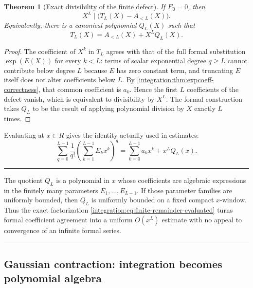 \documentclass[11pt,oneside]{article}
\newtheorem{theorem}{Theorem}[section]
\theoremstyle{definition}
\theoremstyle{remark}
\newenvironment{boxedremark}{%
  \par\smallskip\noindent\begin{center}\begin{minipage}{0.94\textwidth}%
  \color{black}\hrule\vspace{0.6em}\small
}{%
  \vspace{0.6em}\hrule\end{minipage}\end{center}\smallskip
}
\begin{document}
\begin{theorem}[Exact divisibility of the finite defect]
\label{integration:thm:finite-defect-divisibility}
If $E_0=0$, then
\begin{equation}
 X^L\mid\bigl(T_L(X)-A_{<L}(X)\bigr).
 \label{integration:eq:defect-divisibility}
\end{equation}
Equivalently, there is a canonical polynomial $Q_L(X)$ such that
\begin{equation}
 T_L(X)=A_{<L}(X)+X^LQ_L(X).
 \label{integration:eq:exact-finite-remainder-polynomial}
\end{equation}
\end{theorem}

\begin{proof}
The coefficient of $X^k$ in $T_L$ agrees with that of the full formal substitution
$\exp(E(X))$ for every $k<L$: terms of scalar exponential degree $q\ge L$ cannot contribute
below degree $L$ because $E$ has zero constant term, and truncating $E$ itself does not alter
coefficients below $L$.  By \cref{integration:thm:expcoeff-correctness}, that common coefficient is
$a_k$.  Hence the first $L$ coefficients of the defect vanish, which is equivalent to
divisibility by $X^L$.  The formal construction takes $Q_L$ to be the result of applying
polynomial division by $X$ exactly $L$ times.
\end{proof}

Evaluating at $x\in R$ gives the identity actually used in estimates:
\begin{equation}
 \sum_{q=0}^{L-1}\frac1{q!}
 \left(\sum_{k=1}^{L-1}E_kx^k\right)^q
 =\sum_{k=0}^{L-1}a_kx^k+x^LQ_L(x).
 \label{integration:eq:finite-remainder-evaluated}
\end{equation}

\begin{boxedremark}
The quotient $Q_L$ is a polynomial in $x$ whose coefficients are algebraic expressions in
the finitely many parameters $E_1,\ldots,E_{L-1}$.  If those parameter families are uniformly
bounded, then $Q_L$ is uniformly bounded on a fixed compact $x$-window.  Thus the exact
factorization \eqref{integration:eq:finite-remainder-evaluated} turns formal coefficient agreement into a
uniform $O(x^L)$ estimate with no appeal to convergence of an infinite formal series.
\end{boxedremark}

\subsection{Gaussian contraction: integration becomes polynomial algebra}
\label{integration:sec:gaussian-contraction}
\end{document}
